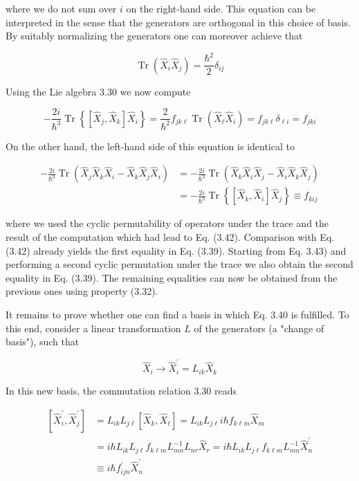 \documentclass[10pt, letterpaper]{article}
\begin{document}
where we do not sum over $i$ on the right-hand side. This equation can be interpreted in the sense that the generators are orthogonal in this choice of basis. By suitably normalizing the generators one can moreover achieve that

$$
\operatorname{Tr}\left(\hat{X}_{i} \hat{X}_{j}\right)=\frac{\hbar^{2}}{2} \delta_{i j}
$$

Using the Lie algebra 3.30 we now compute

$$
-\frac{2 i}{\hbar^{3}} \operatorname{Tr}\left\{\left[\hat{X}_{j}, \hat{X}_{k}\right] \hat{X}_{i}\right\}=\frac{2}{\hbar^{2}} f_{j k \ell} \operatorname{Tr}\left(\hat{X}_{\ell} \hat{X}_{i}\right)=f_{j k \ell} \delta_{\ell i}=f_{j k i}
$$

On the other hand, the left-hand side of this equation is identical to

$$
\begin{aligned}
-\frac{2 i}{\hbar^{3}} \operatorname{Tr}\left(\hat{X}_{j} \hat{X}_{k} \hat{X}_{i}-\hat{X}_{k} \hat{X}_{j} \hat{X}_{i}\right) & =-\frac{2 i}{\hbar^{3}} \operatorname{Tr}\left(\hat{X}_{k} \hat{X}_{i} \hat{X}_{j}-\hat{X}_{i} \hat{X}_{k} \hat{X}_{j}\right) \\
& =-\frac{2 i}{\hbar^{3}} \operatorname{Tr}\left\{\left[\hat{X}_{k}, \hat{X}_{i}\right] \hat{X}_{j}\right\} \equiv f_{k i j}
\end{aligned}
$$

where we used the cyclic permutability of operators under the trace and the result of the computation which had lead to Eq. (3.42). Comparison with Eq. (3.42) already yields the first equality in Eq. (3.39). Starting from Eq. 3.43) and performing a second cyclic permutation under the trace we also obtain the second equality in Eq. (3.39). The remaining equalities can now be obtained from the previous ones using property (3.32).

It remains to prove whether one can find a basis in which Eq. 3.40 is fulfilled. To this end, consider a linear transformation $L$ of the generators (a "change of basis"), such that

$$
\hat{X}_{i} \longrightarrow \hat{X}_{i}^{\prime}=L_{i k} \hat{X}_{k}
$$

In this new basis, the commutation relation 3.30 reads

$$
\begin{aligned}
{\left[\hat{X}_{i}^{\prime}, \hat{X}_{j}^{\prime}\right] } & =L_{i k} L_{j \ell}\left[\hat{X}_{k}, \hat{X}_{\ell}\right]=L_{i k} L_{j \ell} i \hbar f_{k \ell m} \hat{X}_{m} \\
& =i \hbar L_{i k} L_{j \ell} f_{k \ell m} L_{m n}^{-1} L_{n r} \hat{X}_{r}=i \hbar L_{i k} L_{j \ell} f_{k \ell m} L_{m n}^{-1} \hat{X}_{n}^{\prime} \\
& \equiv i \hbar f_{i j n}^{\prime} \hat{X}_{n}^{\prime}
\end{aligned}
$$
\end{document}
